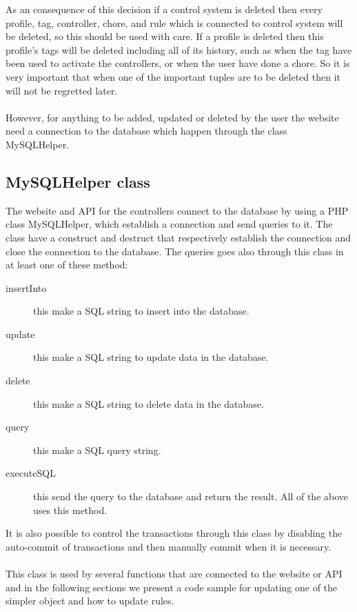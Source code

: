 As an consequence of this decision if a control system is deleted then every profile, tag, controller, chore, and rule which is connected to control system will be deleted, so this should be used with care. 
If a profile is deleted then this profile's tags will be deleted including all of its history, such as when the tag have been used to activate the controllers, or when the user have done a chore.
 So it is very important that when one of the important tuples are to be deleted then it will not be regretted later.  \\\\

However, for anything to be added, updated or deleted by the user the website need a connection to the database which happen through the class MySQLHelper. 

\subsection{MySQLHelper class}
The website and API for the controllers connect to the database by using a PHP class MySQLHelper, which establish a connection and send queries to it. The class have a construct and destruct that respectively establish the connection and close the connection to the database. The queries goes also through this class in at least one of these method:

\begin{description}
	\item[insertInto] this make a SQL string to insert into the database.
	\item[update] this make a SQL string to update data in the database.	
	\item[delete] this make a SQL string to delete data in the database.
	\item[query] this make a SQL query string.
	\item[executeSQL] this send the query to the database and return the result. All of the above uses this method.
\end{description}
  
It is also possible to control the transactions through this class by disabling the auto-commit of transactions and then manually commit when it is necessary. \\\\

This class is used by several functions that are connected to the website or API and in the following sections we present a code sample for updating one of the simpler object and how to update rules. 

